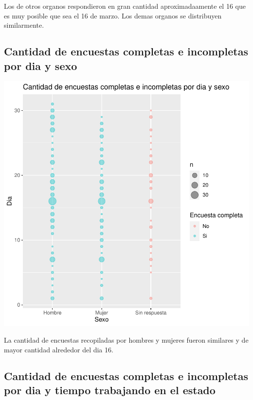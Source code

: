 \documentclass{article}
\begin{document}
Los de otros organos respondieron en gran cantidad aproximadaamente el 16 que es muy posible que sea el 16 de marzo. Los demas organos se distribuyen similarmente.

\subsection{Cantidad de encuestas completas e incompletas por dia y sexo}

\includegraphics{seguimientov3-079}

La cantidad de encuestas recopiladas por hombres y mujeres fueron similares y de mayor cantidad alrededor del dia 16.

\subsection{Cantidad de encuestas completas e incompletas por dia y tiempo trabajando en el estado}
\end{document}
